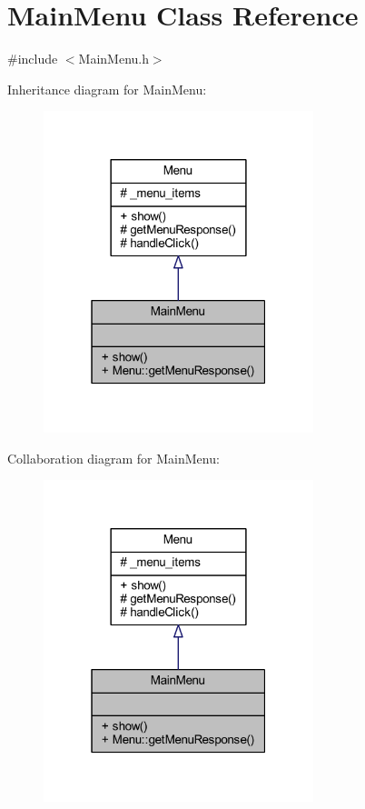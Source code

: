 \hypertarget{class_main_menu}{\section{Main\+Menu Class Reference}
\label{class_main_menu}
}


{\ttfamily \#include $<$Main\+Menu.\+h$>$}



Inheritance diagram for Main\+Menu\+:
\nopagebreak
\begin{figure}[H]
\begin{center}
\leavevmode
\includegraphics[width=223pt]{class_main_menu__inherit__graph}
\end{center}
\end{figure}


Collaboration diagram for Main\+Menu\+:
\nopagebreak
\begin{figure}[H]
\begin{center}
\leavevmode
\includegraphics[width=223pt]{class_main_menu__coll__graph}
\end{center}
\end{figure}
